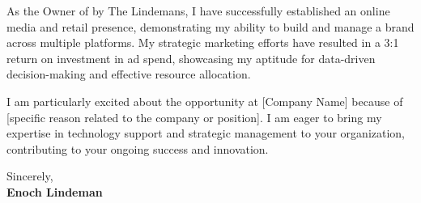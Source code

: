 As the Owner of by The Lindemans, I have successfully established an online media and retail presence, demonstrating my ability to build and manage a brand across multiple platforms. My strategic marketing efforts have resulted in a 3:1 return on investment in ad spend, showcasing my aptitude for data-driven decision-making and effective resource allocation.

I am particularly excited about the opportunity at [Company Name] because of [specific reason related to the company or position]. I am eager to bring my expertise in technology support and strategic management to your organization, contributing to your ongoing success and innovation.

\vspace{0.5cm} %

\noindent Sincerely, \\
\noindent \textbf{Enoch Lindeman}


